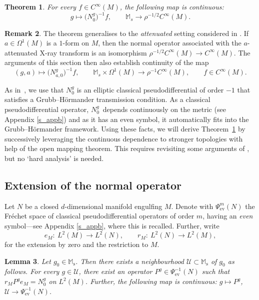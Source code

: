 \documentclass[pdftex]{sigma}
\numberwithin{equation}{section}
\newtheorem{Theorem}{Theorem}[section]
\newtheorem{Lemma}[Theorem]{Lemma}
\theoremstyle{definition}
\newtheorem{Remark}[Theorem]{Remark}
\newcommand{\M}{\mathbb{M}}
\newcommand{\ev}{\mathrm{ev}}
\newcommand{\1}{{\bf 1}}
\begin{document}
\begin{Theorem}\label{thm_ghtop}
For every $f\in C^\infty(M)$, the following map is continuous:
\begin{equation*}
 g\mapsto \bigl(N^g_0\bigr)^{-1}f,\qquad \M_s\rightarrow \rho^{-1/2} C^\infty(M).
\end{equation*}
\end{Theorem}

\begin{Remark}\label{rem_attenuatedverstappen}
The theorem generalises to the {\it attenuated} setting considered in \cite[Section~12.2]{PSU23}. If $a\in \Omega^1(M)$ is a $1$-form on $M$, then the normal operator  associated with the $a$-attenuated X-ray transform is an isomorphism $\rho^{-1/2}C^\infty(M)\to C^\infty(M)$. The arguments of this section then also establish continuity of the map
\[	
	(g,a) \mapsto \bigl(N^g_{a,0}\bigr)^{-1}f,\qquad \mathbb M_s\times \Omega^1(M)\to \rho^{-1} C^\infty(M),\qquad f\in C^\infty(M).
\]
\end{Remark}

As in~\cite{MNP19a}, we use that $N^g_0$ is an elliptic classical pseudodifferential of order $-1$ that satisfies a Grubb--H{\"o}rmander transmission condition. As a classical pseudodifferential operator, $N_0^g$~depends continuously on the metric (see Appendix \ref{s_appb}) and as it has an even symbol, it automatically fits into the Grubb--H{\"o}rmander framework. Using these facts, we will derive Theorem~\ref{thm_ghtop} by successively leveraging the continuous dependence to stronger topologies with help of the open mapping theorem. This requires revisiting some arguments of \cite{MNP19a}, but no `hard analysis' is needed.

\subsection{Extension of the normal operator} Let $N$ be a closed $d$-dimensional manifold engulfing $M$. Denote with $\Psi^{m}_\ev(N)$ the Fr{\'e}chet space of classical pseudodifferential operators of order $m$, having an {\it even} symbol---see Appendix \ref{s_appb}, where this is recalled. Further, write
\[
	e_M\colon\ L^2(M)\rightarrow L^2(N),\qquad r_M\colon\ L^2(N)\rightarrow L^2(M),
\]
for the extension by zero and the restriction to $M$.
\begin{Lemma}\label{lem_next} Let $g_0\in \M_\mathrm{s}$. Then there exists a neighbourhood $\mathcal U\subset \M_{\mathrm s}$ of $g_0$ as follows. For every $g\in \mathcal U$, there exist an operator $P^g\in \Psi^{-1}_\ev(N)$ such that
$
r_M P^g e_M = N_0^g$ on $ L^2(M)$.
Further, the following map is continuous:
$
g\mapsto P^g$, $ \mathcal U\rightarrow \Psi^{-1}_\ev(N)$.
\end{Lemma}
\end{document}
